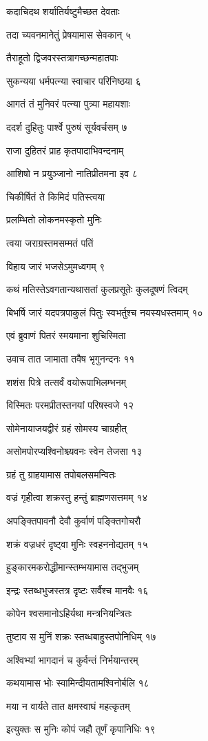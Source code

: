 कदाचिदथ शर्यातिर्यष्टुमैच्छत देवताः

तदा च्यवनमानेतुं प्रेषयामास सेवकान् ५

तैराहूतो द्विजवरस्तत्रागच्छन्महातपाः

सुकन्यया धर्मपत्न्या स्वाचार परिनिष्ठया ६

आगतं तं मुनिवरं पत्न्या पुत्र्या महायशाः

ददर्श दुहितुः पार्श्वे पुरुषं सूर्यवर्चसम् ७

राजा दुहितरं प्राह कृतपादाभिवन्दनाम्

आशिषो न प्रयुञ्जानो नातिप्रीतमना इव ८

चिकीर्षितं ते किमिदं पतिस्त्वया

प्रलम्भितो लोकनमस्कृतो मुनिः

त्वया जराग्रस्तमसम्मतं पतिं

विहाय जारं भजसेऽमुमध्वगम् ९

कथं मतिस्तेऽवगतान्यथासतां कुलप्रसूतेः कुलदूषणं त्विदम्

बिभर्षि जारं यदपत्रपाकुलं पितुः स्वभर्तुश्च नयस्यधस्तमाम् १०

एवं ब्रुवाणं पितरं स्मयमाना शुचिस्मिता

उवाच तात जामाता तवैष भृगुनन्दनः ११

शशंस पित्रे तत्सर्वं वयोरूपाभिलम्भनम्

विस्मितः परमप्रीतस्तनयां परिषस्वजे १२

सोमेनायाजयद्वीरं ग्रहं सोमस्य चाग्रहीत्

असोमपोरप्यश्विनोश्च्यवनः स्वेन तेजसा १३

ग्रहं तु ग्राहयामास तपोबलसमन्वितः

वज्रं गृहीत्वा शक्रस्तु हन्तुं ब्राह्मणसत्तमम् १४

अपङ्क्तिपावनौ देवौ कुर्वाणं पङ्क्तिगोचरौ

शक्रं वज्रधरं दृष्ट्वा मुनिः स्वहननोद्यतम् १५

हुङ्कारमकरोद्धीमान्स्तम्भयामास तद्भुजम्

इन्द्रः स्तब्धभुजस्तत्र दृष्टः सर्वैश्च मानवैः १६

कोपेन श्वसमानोऽहिर्यथा मन्त्रनियन्त्रितः

तुष्टाव स मुनिं शक्रः स्तब्धबाहुस्तपोनिधिम् १७

अश्विभ्यां भागदानं च कुर्वन्तं निर्भयान्तरम्

कथयामास भोः स्वामिन्दीयतामश्विनोर्बलि १८

मया न वार्यते तात क्षमस्वाघं महत्कृतम्

इत्युक्तः स मुनिः कोपं जहौ तूर्णं कृपानिधिः १९

